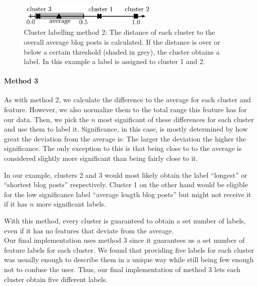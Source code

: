 \begin{figure}[ht!]
	\centering
	\includegraphics[width=0.6\textwidth]{images/cluster_labeling_2.pdf}
	\caption{Cluster labelling method 2: The distance of each cluster to the overall average blog posts is calculated. If the distance is over or below a certain threshold (shaded in grey), the cluster obtains a label. In this example a label is assigned to cluster 1 and 2.}
	\label{fig:cluster_labeling_2}
\end{figure}


\paragraph{Method 3}
As with method 2, we calculate the difference to the average for each cluster and feature.
However, we also normalize them to the total range this feature has for our data.
Then, we pick the $n$ most significant of these differences for each cluster and use them to label it.
Significance, in this case, is mostly determined by how great the deviation from the average is: The larger the deviation the higher the significance.
The only exception to this is that being close to to the average is considered slightly more significant than being fairly close to it.

In our example, clusters 2 and 3 would most likely obtain the label ``longest'' or ``shortest blog posts'' respectively.
Cluster 1 on the other hand would be eligible for the low significance label ``average length blog posts'' but might not receive it if it has $n$ more significant labels.

With this method, every cluster is guaranteed to obtain a set number of labels, even if it has no features that deviate from the average. \\


Our final implementation uses method 3 since it guarantees us a set number of feature labels for each cluster.
We found that providing five labels for each cluster was usually enough to describe them in a unique way while still being few enough not to confuse the user.
Thus, our final implementation of method 3 lets each cluster obtain five different labels.
